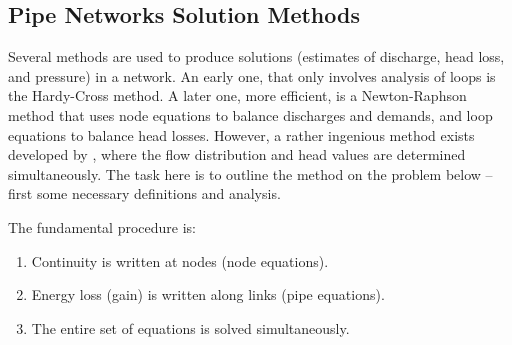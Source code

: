 


\subsection{Pipe Networks Solution Methods}
Several methods are used to produce solutions (estimates of discharge, head loss, and pressure) in a network.  
An early one, that only involves analysis of loops is the Hardy-Cross method.  
A later one, more efficient, is a Newton-Raphson method that uses node equations to balance discharges and demands, and loop equations to balance head losses.  
However, a rather ingenious method exists developed by \cite{Haman1971}, where the flow distribution and head values are determined simultaneously.   The task here is to  outline the \cite{Haman1971} method on the problem below -- first some necessary definitions and analysis.

The fundamental procedure is:
\begin{enumerate}
\item Continuity is written at nodes (node equations).
\item Energy loss (gain) is written along links (pipe equations).
\item The entire set of equations is solved simultaneously.
\end{enumerate}

